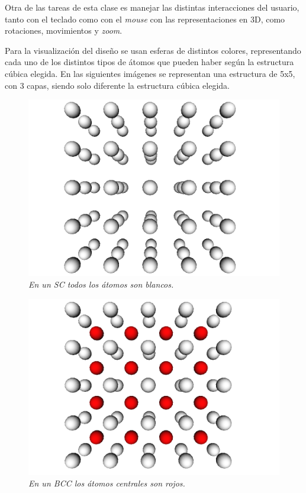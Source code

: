 Otra de las tareas de esta clase es manejar las distintas interacciones del usuario, tanto con el teclado como con el \emph{mouse} con las representaciones en 3D, como rotaciones, movimientos y \emph{zoom}.

Para la visualización del diseño se usan esferas de distintos colores, representando cada uno de los distintos tipos de átomos que pueden haber según la estructura cúbica elegida. En las siguientes imágenes se representan una estructura de 5x5, con 3 capas, siendo solo diferente la estructura cúbica elegida.

\begin{figure}[H]
  \centering
  \includegraphics[scale=.3]{images/atomCanvas-SC}
  \caption{\em En un SC todos los átomos son blancos.}
\end{figure}

\begin{figure}[H]
  \centering
  \includegraphics[scale=.3]{images/atomCanvas-BCC}
  \caption{\em En un BCC los átomos centrales son rojos.}
\end{figure}

